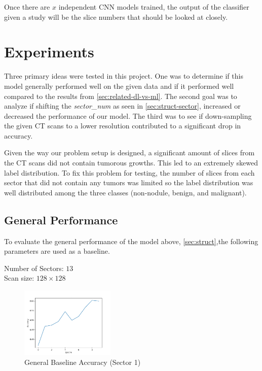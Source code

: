 \documentclass[10pt,twocolumn,letterpaper]{article}
\begin{document}
        Once there are $x$ independent CNN models trained, the output of the classifier given a study will
        be the slice numbers that should be looked at closely.

\section{Experiments} \label{sec:experiments}
   Three primary ideas were tested in this project. One was to determine if this model generally performed well on the given data and if it performed well
   compared to the results from \ref{sec:related-dl-vs-ml}. The second goal was to analyze if shifting the
   {\it sector\_num} as seen in \ref{sec:struct-sector}, increased or decreased the performance of our model. The third was to see if down-sampling the 
   given CT scans to a lower resolution contributed to a significant drop in accuracy.

   Given the way our problem setup is designed, a significant amount of slices from the CT scans did not contain tumorous growths. This led to an extremely
   skewed label distribution. To fix this problem for testing, the number of slices from each sector that did not contain any tumors was limited so the label
   distribution was well distributed among the three classes (non-nodule, benign, and malignant).

   \subsection{General Performance} \label{sec:experiments-general-performance}
      To evaluate the general performance of the model above, \ref{sec:struct},the following parameters are used as a baseline.

      \begin{center}
         Number of Sectors: $13$ \\
         Scan size: $128 \times 128$
      \end{center}
    
      \begin{figure}
         \centering
         \includegraphics[width=0.4\textwidth]{./images/training_accuracy_13_sector_128_px.png}
         \caption{General Baseline Accuracy (Sector 1)}
         \label{fig:experiments-general-acc}
      \end{figure}
    
\end{document}
